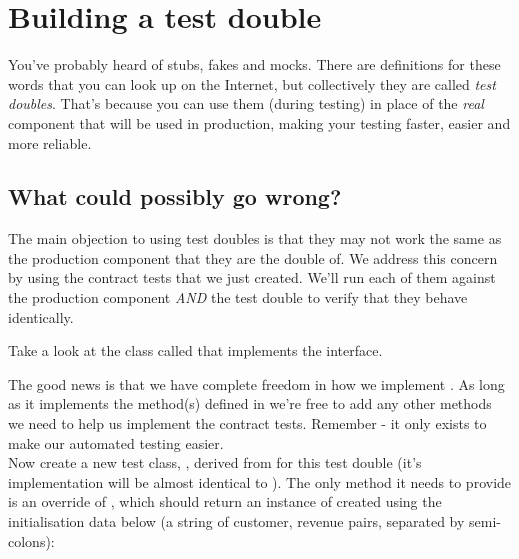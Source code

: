 \chapter*{Building a test double}

You've probably heard of stubs, fakes and mocks. There are definitions for these words that you can look up on the Internet, but collectively they are called \emph{test doubles}. That's because you can use them (during testing) in place of the \emph{real} component that will be used in production, making your testing faster, easier and more reliable.

\section*{What could possibly go wrong?}

The main objection to using test doubles is that they may not work the same as the production component that they are the double of. We address this concern by using the contract tests that we just created. We'll run each of them against the production component \emph{AND} the test double to verify that they behave identically.

Take a look at the class called \texttt{\FakeRevenueProvider} that implements the \texttt{\RevenueProviderInterface} interface.


The good news is that we have complete freedom in how we implement \texttt{\FakeRevenueProvider}. As long as it implements the method(s) defined in \textvtt{\RevenueProviderInterface} we're free to add any other methods we need to help us implement the contract tests. Remember - it only exists to make our automated testing easier. \\

Now create a new test class, \texttt{\FakeRevenueProviderContractTests}, derived from \texttt{\RevenueProviderContractTests} for this test double (it's implementation will be almost identical to \texttt{\ProductionRevenueProviderContractTests}). The only method it needs to provide is an override of \texttt{\GetRevenueProviderMethod}, which should return an instance of \texttt{\FakeRevenueProvider} created using the initialisation data below (a string of customer, revenue pairs, separated by semi-colons):

\hspace{2cm}\texttt{}

